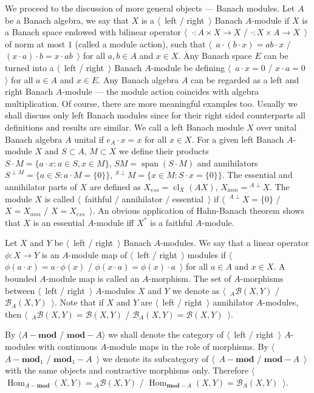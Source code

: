 We proceed to the discussion of more general objects --- Banach modules. Let $A$
be a Banach algebra, we say that $X$ is a $\langle$~left / right~$\rangle$
Banach $A$-module if $X$ is a Banach space endowed with bilinear operator
$\langle$~$\cdot:A\times X\to X$ / $\cdot: X\times A\to X$~$\rangle$ of norm at
most $1$ (called a module action), such that 
$\langle$~$a\cdot(b\cdot x)=ab\cdot x$ / 
$(x\cdot a)\cdot b=x\cdot ab$~$\rangle$ for all $a,b\in A$ and $x\in X$.
Any Banach space $E$ can be turned into a $\langle$~left / right~$\rangle$
Banach $A$-module be defining $\langle$~$a\cdot x=0$ / $x\cdot a=0$~$\rangle$
for all $a\in A$ and $x\in E$. Any Banach algebra $A$ can be regarded as a left
and right Banach $A$-module --- the module action coincides with algebra
multiplication. Of course, there are more meaningful examples too.  Usually we
shall discuss only left Banach modules since for their right sided counterparts
all definitions and results are similar. We call a left Banach module $X$ over
unital Banach algebra $A$ unital if $e_A\cdot x=x$ for all $x\in X$. For a given
left Banach $A$-module $X$ and $S\subset A$, $M\subset X$ we define their
products $S\cdot M= \{a\cdot x:a\in S, x\in M \}$, 
$SM=\operatorname{span} (S\cdot M)$ and annihilators 
$S^{\perp M}= \{a\in S:a\cdot M= \{0 \} \}$,
${}^{S\perp}M= \{x\in M: S\cdot x= \{0 \} \}$. The essential and annihilator
parts of $X$ are defined as $X_{ess}=\operatorname{cl}_X(A X)$,
$X_{ann}={}^{A\perp}X$. The module $X$ is called $\langle$~faithful /
annihilator / essential~$\rangle$ if $\langle$~${}^{A\perp}X= \{0 \}$ /
$X=X_{ann}$ / $X=X_{ess}$~$\rangle$. An obvious application of Hahn-Banach
theorem shows that $X$ is an essential $A$-module iff $X^*$ is a faithful
$A$-module.

Let $X$ and $Y$ be $\langle$~left / right~$\rangle$ Banach $A$-modules. We say
that a linear operator $\phi:X\to Y$ is an $A$-module map of $\langle$~left /
right~$\rangle$ modules if $\langle$~$\phi(a\cdot x)=a\cdot \phi(x)$ /
$\phi(x\cdot a)=\phi(x)\cdot a$~$\rangle$ for all $a\in A$ and $x\in X$. A
bounded $A$-module map is called an $A$-morphism. The set of $A$-morphisms
between $\langle$~left / right~$\rangle$ $A$-modules $X$ and $Y$ we denote as
$\langle$~${}_A\mathcal{B}(X,Y)$ / $\mathcal{B}_A(X,Y)$~$\rangle$. Note that if
$X$ and $Y$ are $\langle$~left / right~$\rangle$ annihilator $A$-modules, then
$\langle$~${}_A\mathcal{B}(X,Y)=\mathcal{B}(X,Y)$ /
$\mathcal{B}_A(X,Y)=\mathcal{B}(X,Y)$~$\rangle$.

By $\langle A-\mathbf{mod}$ / $\mathbf{mod}-A\rangle$ we shall denote the
category of $\langle$~left / right~$\rangle$ $A$-modules with continuous
$A$-module maps in the role of morphisms. By $\langle$~$A-\mathbf{mod}_1$ /
$\mathbf{mod}_1-A$~$\rangle$ we denote its subcategory of
$\langle$~$A-\mathbf{mod}$ / $\mathbf{mod}-A$~$\rangle$ with the same objects
and contractive morphisms only. Therefore 
$\langle$~$\operatorname{Hom}_{A-\mathbf{mod}}(X,Y)={}_A\mathcal{B}(X,Y)$ /
$\operatorname{Hom}_{\mathbf{mod}-A}(X,Y)=\mathcal{B}_A(X,Y)$~$\rangle$. 

